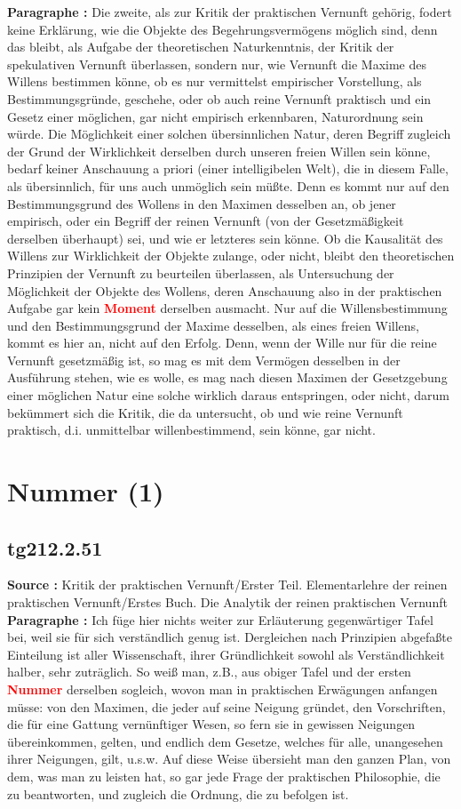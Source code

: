 \documentclass[a4paper,12pt,twoside]{book}
\newcommand{\match}[1]{\textcolor{red}{\textbf{#1}}}
\newcommand{\unnumberedsection}[1]{
	\section*{#1}
	\addcontentsline{toc}{section}{#1}
	\markright{#1}
}
\begin{document}
	\noindent\textbf{Paragraphe : }Die zweite, als zur Kritik der praktischen Vernunft gehörig, fodert keine Erklärung, wie die Objekte des Begehrungsvermögens möglich sind, denn das bleibt, als Aufgabe der theoretischen Naturkenntnis, der Kritik der spekulativen Vernunft überlassen, sondern nur, wie Vernunft die Maxime des Willens bestimmen könne, ob es nur vermittelst empirischer Vorstellung, als Bestimmungsgründe, geschehe, oder ob auch reine Vernunft praktisch und ein Gesetz einer möglichen, gar nicht empirisch erkennbaren, Naturordnung sein würde. Die Möglichkeit einer solchen übersinnlichen Natur, deren Begriff zugleich der Grund der Wirklichkeit derselben durch unseren freien Willen sein könne, bedarf keiner Anschauung a priori (einer intelligibelen Welt), die in diesem Falle, als übersinnlich, für uns auch unmöglich sein müßte. Denn es kommt nur auf den Bestimmungsgrund des Wollens in den Maximen desselben an, ob jener empirisch, oder ein Begriff der reinen Vernunft (von der Gesetzmäßigkeit derselben überhaupt) sei, und wie er letzteres sein könne. Ob die Kausalität des Willens zur Wirklichkeit der Objekte zulange, oder nicht, bleibt den theoretischen Prinzipien der Vernunft zu beurteilen überlassen, als Untersuchung der Möglichkeit der Objekte des Wollens, deren Anschauung also in der praktischen Aufgabe gar kein \match{Moment} derselben ausmacht. Nur auf die Willensbestimmung und den Bestimmungsgrund der Maxime desselben, als eines freien Willens, kommt es hier an, nicht auf den Erfolg. Denn,  wenn der Wille nur für die reine Vernunft gesetzmäßig ist, so mag es mit dem Vermögen desselben in der Ausführung stehen, wie es wolle, es mag nach diesen Maximen der Gesetzgebung einer möglichen Natur eine solche wirklich daraus entspringen, oder nicht, darum bekümmert sich die Kritik, die da untersucht, ob und wie reine Vernunft praktisch, d.i. unmittelbar willenbestimmend, sein könne, gar nicht. 
	
	\unnumberedsection{Nummer (1)} 
	\subsection*{tg212.2.51} 
	\textbf{Source : }Kritik der praktischen Vernunft/Erster Teil. Elementarlehre der reinen praktischen Vernunft/Erstes Buch. Die Analytik der reinen praktischen Vernunft\\  
	
	\noindent\textbf{Paragraphe : }
	Ich füge hier nichts weiter zur Erläuterung gegenwärtiger Tafel bei, weil sie für sich verständlich genug ist. Dergleichen nach Prinzipien abgefaßte Einteilung ist aller Wissenschaft, ihrer Gründlichkeit sowohl als Verständlichkeit halber, sehr zuträglich. So weiß man, z.B., aus obiger Tafel und der ersten \match{Nummer} derselben sogleich, wovon man in praktischen Erwägungen anfangen müsse: von den Maximen, die jeder auf seine Neigung gründet, den Vorschriften, die für eine Gattung vernünftiger Wesen, so fern sie in gewissen Neigungen übereinkommen, gelten, und endlich dem Gesetze, welches für alle, unangesehen ihrer Neigungen, gilt, u.s.w. Auf diese Weise übersieht man den ganzen Plan, von dem, was man zu leisten hat, so gar jede Frage der praktischen Philosophie, die zu beantworten, und zugleich die Ordnung, die zu befolgen ist. 
	
\end{document}
